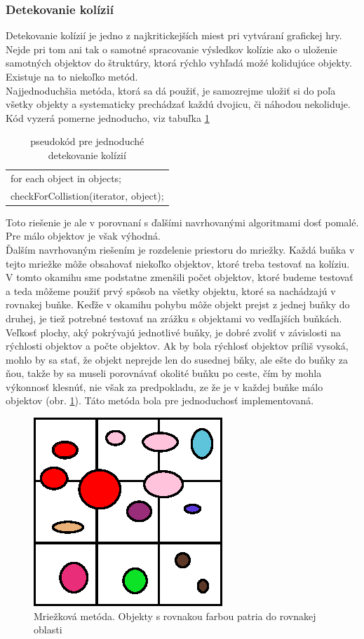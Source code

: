\subsubsection{Detekovanie kolízií}
Detekovanie kolízií je jedno z najkritickejších miest pri vytváraní grafickej hry. Nejde pri tom ani tak o samotné spracovanie výsledkov kolízie ako o uloženie samotných objektov do štruktúry, ktorá rýchlo vyhľadá možé kolidujúce objekty. Existuje na to niekoľko metód.\\
Najjednoduchšia metóda, ktorá sa dá použiť, je samozrejme uložiť si do poľa všetky objekty a systematicky prechádzať každú dvojicu, či náhodou nekoliduje. Kód vyzerá pomerne jednoducho, viz tabuľka \ref{tab:k1} \\
\begin{table}
\centering
\begin{tabular}{|l|}
\hline
for each object in objects;\\
checkForCollistion(iterator, object);\\
\hline
\end{tabular}
\caption{pseudokód pre jednoduché detekovanie kolízií} %
\label{tab:k1}
\end{table}
Toto riešenie je ale v porovnaní s ďalšími navrhovanými algoritmami dosť pomalé. Pre málo objektov je však výhodná.\\
\indent Ďalším navrhovaným riešením je rozdelenie priestoru do mriežky. Každá buňka v tejto mriežke môže obsahovať niekoľko objektov, ktoré treba testovať na kolíziu. V tomto okamihu sme podstatne zmenšili počet objektov, ktoré budeme testovať a teda môžeme použiť prvý spôsob na všetky objektu, ktoré sa nachádzajú v rovnakej buňke. Keďže v okamihu pohybu môže objekt prejst z jednej buňky do druhej, je tiež potrebné testovať na zrážku s objektami vo vedľajších buňkách. Veľkosť plochy, aký pokrývajú jednotlivé buňky, je dobré zvoliť v závislosti na rýchlosti objektov a počte objektov. Ak by bola rýchlosť objektov príliš vysoká, mohlo by sa stať, že objekt neprejde len do susednej bňky, ale ešte do buňky za ňou, takže by sa museli porovnávať okolité buňku po ceste, čím by mohla výkonnosť klesnúť, nie však za predpokladu, ze že je v každej buňke málo objektov (obr. \ref{fig:hash}). Táto metóda bola pre jednoduchosť implementovaná.\\%
\begin{figure}
\centering
	\includegraphics[totalheight=0.2\textheight,width=.2\textwidth]{mriezka}
\caption { Mriežková metóda. Objekty s rovnakou farbou patria do rovnakej oblasti}
\label{fig:hash}
\end{figure}
